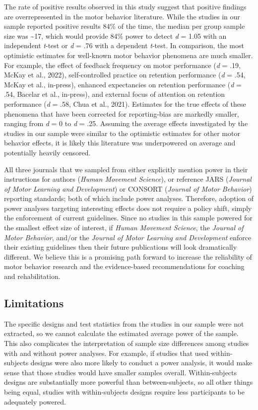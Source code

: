 \documentclass[
  doc, donotrepeattitle,floatsintext]{apa7}
\begin{document}
The rate of positive results observed in this study suggest that positive findings are overrepresented in the motor behavior literature. While the studies in our sample reported positive results 84\% of the time, the median per group sample size was \textasciitilde17, which would provide 84\% power to detect \emph{d} = 1.05 with an independent \emph{t}-test or \emph{d} = .76 with a dependent \emph{t}-test. In comparison, the most optimistic estimates for well-known motor behavior phenomena are much smaller. For example, the effect of feedback frequency on motor performance (\emph{d} = .19, McKay et al., 2022), self-controlled practice on retention performance (\emph{d} = .54, McKay et al., in-press), enhanced expectancies on retention performance (\emph{d} = .54, Bacelar et al., in-press), and external focus of attention on retention performance (\emph{d} = .58, Chua et al., 2021). Estimates for the true effects of these phenomena that have been corrected for reporting-bias are markedly smaller, ranging from \emph{d} = 0 to \emph{d} = .25. Assuming the average effects investigated by the studies in our sample were similar to the optimistic estimates for other motor behavior effects, it is likely this literature was underpowered on average and potentially heavily censored.

All three journals that we sampled from either explicitly mention power in their instructions for authors (\emph{Human Movement Science}), or reference JARS (\emph{Journal of Motor Learning and Development}) or CONSORT (\emph{Journal of Motor Behavior}) reporting standards; both of which include power analyses. Therefore, adoption of power analyses targeting interesting effects does not require a policy shift, simply the enforcement of current guidelines. Since no studies in this sample powered for the smallest effect size of interest, if \emph{Human Movement Science}, the \emph{Journal of Motor Behavior}, and/or the \emph{Journal of Motor Learning and Development} enforce their existing guidelines then their future publications will look dramatically different. We believe this is a promising path forward to increase the reliability of motor behavior research and the evidence-based recommendations for coaching and rehabilitation.

\hypertarget{limitations}{%
\subsection{Limitations}\label{limitations}}

The specific designs and test statistics from the studies in our sample were not extracted, so we cannot calculate the estimated average power of the sample. This also complicates the interpretation of sample size differences among studies with and without power analyses. For example, if studies that used within-subjects designs were also more likely to conduct a power analysis, it would make sense that those studies would have smaller samples overall. Within-subjects designs are substantially more powerful than between-subjects, so all other things being equal, studies with within-subjects designs require less participants to be adequately powered.
\end{document}
